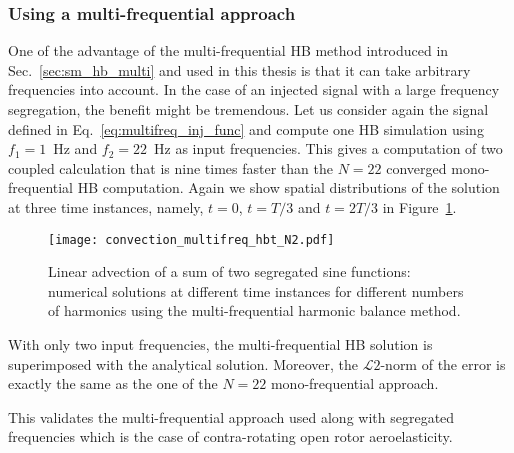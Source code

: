 \subsubsection{Using a multi-frequential approach}

One of the advantage of the multi-frequential HB method introduced in Sec.~\ref{sec:sm_hb_multi}
and used in this thesis is that it can take arbitrary frequencies into account.
In the case of an injected signal with a large frequency segregation, the
benefit might be tremendous. Let us consider again the signal defined in 
Eq.~\eqref{eq:multifreq_inj_func} and compute one HB simulation using 
$f_1=1$~Hz and $f_2=22$~Hz as input frequencies. This gives a computation
of two coupled calculation
that is nine times faster than the $N=22$ converged mono-frequential
HB computation.
Again
we show spatial distributions of the solution
at three time instances, namely, $t=0$, $t=T/3$ and $t=2T/3$
in Figure~\ref{fig:inj_multifreq_hb}.
\begin{figure}[htp]
  \centering
  \texttt{[image: convection\_multifreq\_hbt\_N2.pdf]}
  \caption{Linear advection of a sum of two segregated sine functions: 
  numerical solutions at different time instances for different numbers of harmonics using the
  multi-frequential harmonic balance method.}
  \label{fig:inj_multifreq_hb}
\end{figure}
With only two input frequencies, the multi-frequential
HB solution is superimposed with the analytical solution.
Moreover, the $\mathcal{L}2$-norm of the error is 
exactly the same as the one of the $N=22$ mono-frequential
approach.

This validates the multi-frequential approach 
used along with segregated frequencies which is 
the case of contra-rotating open rotor aeroelasticity.
